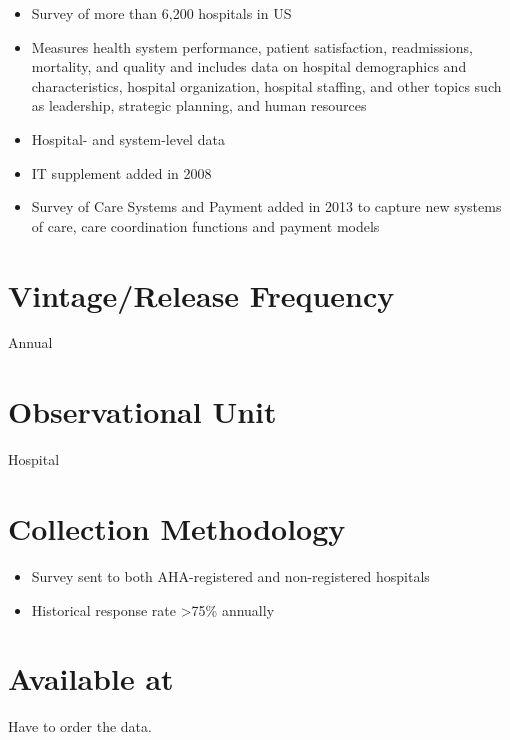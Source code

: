 \documentclass[
]{book}
\providecommand{\tightlist}{%
  \setlength{\itemsep}{0pt}\setlength{\parskip}{0pt}}
\begin{document}
\begin{itemize}
\tightlist
\item
  Survey of more than 6,200 hospitals in US
\item
  Measures health system performance, patient satisfaction, readmissions, mortality, and quality and includes data on hospital demographics and characteristics, hospital organization, hospital staffing, and other topics such as leadership, strategic planning, and human resources
\item
  Hospital- and system-level data
\item
  IT supplement added in 2008
\item
  Survey of Care Systems and Payment added in 2013 to capture new systems of care, care coordination functions and payment models
\end{itemize}

\hypertarget{vintagerelease-frequency-5}{%
\section{Vintage/Release Frequency}\label{vintagerelease-frequency-5}}

Annual

\hypertarget{observational-unit-5}{%
\section{Observational Unit}\label{observational-unit-5}}

Hospital

\hypertarget{collection-methodology-5}{%
\section{Collection Methodology}\label{collection-methodology-5}}

\begin{itemize}
\tightlist
\item
  Survey sent to both AHA-registered and non-registered hospitals
\item
  Historical response rate \textgreater75\% annually
\end{itemize}

\hypertarget{available-at-5}{%
\section{Available at}\label{available-at-5}}

Have to order the data.
\end{document}

